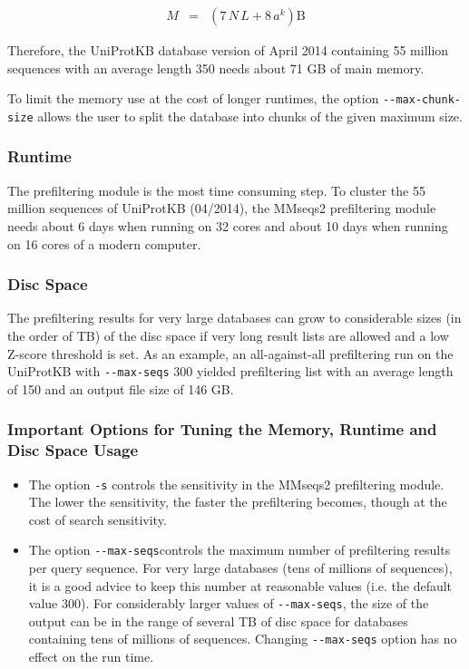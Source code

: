 \documentclass[11pt,a4paper]{scrreprt}
\begin{document}
\begin{eqnarray*}
M & = & (7\, N\, L+8\, a^{k})\mathrm{B}
\end{eqnarray*}

Therefore, the UniProtKB database version of April 2014 containing 55 million sequences with an average length 350 needs about 71 GB of main memory. 

To limit the memory use at the cost of longer runtimes, the option \texttt{-{}-max-chunk-size} allows the user to split the database into chunks of the given maximum size. 
\subsubsection{Runtime}
The prefiltering module is the most time consuming step. To cluster the 55 million sequences of UniProtKB (04/2014), the MMseqs2 prefiltering module needs about 6 days when running on 32 cores and about 10 days when running on 16 cores of a modern computer.
\subsubsection{Disc Space}
The prefiltering results for very large databases can grow to considerable sizes (in the order of TB) of the disc space if very long result lists are allowed and a low Z-score threshold is set. As an example, an all-against-all prefiltering run on the UniProtKB with \texttt{-{}-max-seqs} 300 yielded prefiltering list with an average length of 150 and an output file size of 146 GB.
\subsubsection{Important Options for Tuning the Memory, Runtime and Disc Space Usage}
\begin{itemize}
\item The option \texttt{-s} controls the sensitivity in the MMseqs2 prefiltering module. The lower the sensitivity, the faster the prefiltering becomes, though at the cost of search sensitivity. 
\item The option \texttt{-{}-max-seqs}controls the maximum number of prefiltering results per query sequence. For very large databases (tens of millions of sequences), it is a good advice to keep this number at reasonable values (i.e. the default value 300). For considerably larger values of \texttt{-{}-max-seqs}, the size of the output can be in the range of several TB of disc space for databases containing tens of millions of sequences. Changing \texttt{-{}-max-seqs} option has no effect on the run time.
\end{itemize}
\end{document}
